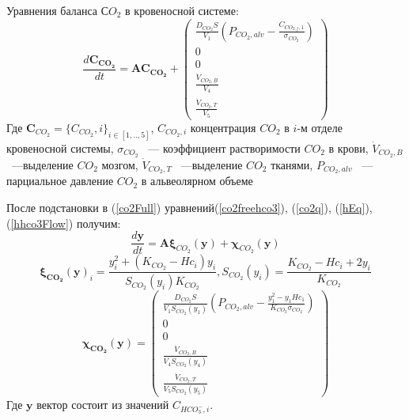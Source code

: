 Уравнения баланса \(СO_{2}\) в кровеносной системе:
\begin{equation}
\displaystyle \frac{d\mathbf{C_{CO_{2}}}}{dt}
=\mathbf{A} \mathbf{C_{CO_{2}}}+\begin{pmatrix}
\displaystyle \frac{D_{CO_{2}}S}{V_{1}}\left(P_{CO_{2},alv}-\frac{C_{CO_{2,f},1}}{\sigma_{CO_{2}}} \right) \\
0 \\
0 \\
\displaystyle \frac{\dot{V}_{CO_{2},B}}{V_{4}} \\
\displaystyle \frac{\dot{V}_{CO_{2},T}}{V_{5}}
\label{co2Full}
\end{pmatrix}
\end{equation}
Где $\mathbf{C}_{CO_2} = \{ C_{CO_2},i \}_{i \in [1,..,5]}$, $C_{CO_2,i}$ концентрация $CO_2$ в $i$-м отделе кровеносной системы, \( \sigma_{CO_{2}} \) ~--- коэффициент растворимости \( CO_{2}\) в крови, \( \dot{V}_{CO_{2},B}\) ~---выделение \( CO_{2}\) мозгом, \( \dot{V}_{CO_{2},T}\) ~---выделение \( CO_{2}\) тканями, \( P_{CO_{2},alv} \) ~--- парциальное давление \( CO_{2}\) в альвеолярном объеме

После подстановки в (\ref{co2Full}) уравнений(\ref{co2freehco3}), (\ref{co2q}), (\ref{hEq}), (\ref{hhco3Flow}) получим: 
\begin{equation}
\displaystyle \frac{d\textbf{y}}{dt}
=\mathbf{A}\mathbf{\xi}_{CO_{2}}(\textbf{y})+\mathbf{\chi}_{CO_{2}}(\textbf{y})
\label{hco3Flow}
\end{equation}
\begin{equation}
\mathbf{\xi_{CO_{2}}}(\textbf{y})_{i}=\frac{y_{i}^2+(K_{CO_{2}}-Hc_{i})y_{i}}{S_{CO_{2}}(y_{i})K_{CO_{2}}}, S_{CO_{2}}(y_{i})=\frac{K_{CO_{2}}-Hc_{i}+2y_{i}}{K_{CO_{2}}}
\end{equation}
\begin{equation}
\mathbf{\chi_{CO_{2}}}(\mathbf{y})=\begin{pmatrix}
\displaystyle \frac{D_{CO_{2}}S}{V_{1}S_{CO_{2}}(y_{1})}\left(P_{CO_{2},alv}-\frac{y_{1}^2-y_{1}Hc_{1}}{K_{CO_{2}} \sigma_{CO_{2}}} \right) \\
0 \\
0 \\
\displaystyle \frac{\dot{V}_{CO_{2},B}}{V_{4}S_{CO_{2}}(y_{4})} \\
\displaystyle \frac{\dot{V}_{CO_{2},T}}{V_{5}S_{CO_{2}}(y_{5})}
\end{pmatrix}
\label{co2source}
\end{equation}
Где \(\textbf{y}\) вектор состоит из значений $C_{HCO_{3}^{-},i}$.

